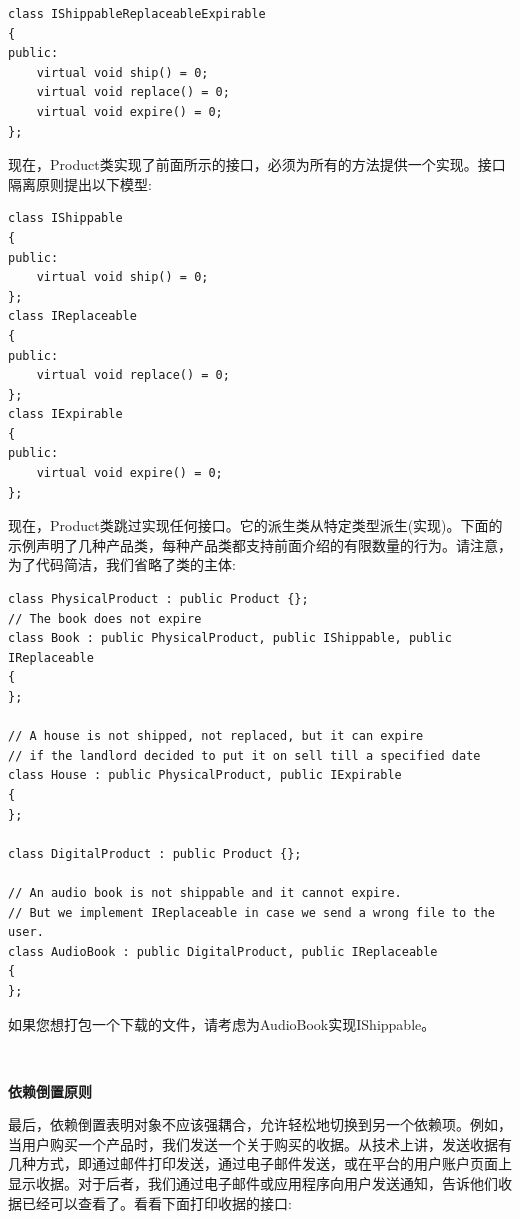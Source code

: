 \begin{lstlisting}[caption={}]
class IShippableReplaceableExpirable
{
public:
	virtual void ship() = 0;
	virtual void replace() = 0;
	virtual void expire() = 0;
};
\end{lstlisting}

现在，Product类实现了前面所示的接口，必须为所有的方法提供一个实现。接口隔离原则提出以下模型: \par

\begin{lstlisting}[caption={}]
class IShippable
{
public:
	virtual void ship() = 0;
};
class IReplaceable
{
public:
	virtual void replace() = 0;
};
class IExpirable
{
public:
	virtual void expire() = 0;
};
\end{lstlisting}

现在，Product类跳过实现任何接口。它的派生类从特定类型派生(实现)。下面的示例声明了几种产品类，每种产品类都支持前面介绍的有限数量的行为。请注意，为了代码简洁，我们省略了类的主体: \par

\begin{lstlisting}[caption={}]
class PhysicalProduct : public Product {};
// The book does not expire
class Book : public PhysicalProduct, public IShippable, public IReplaceable
{
};

// A house is not shipped, not replaced, but it can expire
// if the landlord decided to put it on sell till a specified date
class House : public PhysicalProduct, public IExpirable
{
};

class DigitalProduct : public Product {};

// An audio book is not shippable and it cannot expire.
// But we implement IReplaceable in case we send a wrong file to the user.
class AudioBook : public DigitalProduct, public IReplaceable
{
};
\end{lstlisting}

如果您想打包一个下载的文件，请考虑为AudioBook实现IShippable。 \par

\noindent\textbf{}\ \par
\textbf{依赖倒置原则} \ \par
最后，依赖倒置表明对象不应该强耦合，允许轻松地切换到另一个依赖项。例如，当用户购买一个产品时，我们发送一个关于购买的收据。从技术上讲，发送收据有几种方式，即通过邮件打印发送，通过电子邮件发送，或在平台的用户账户页面上显示收据。对于后者，我们通过电子邮件或应用程序向用户发送通知，告诉他们收据已经可以查看了。看看下面打印收据的接口: \par


